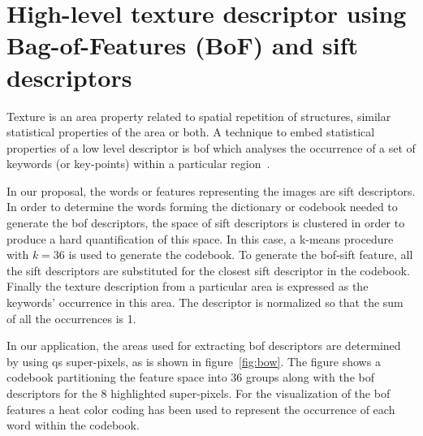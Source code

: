 \documentclass[a4paper, 10pt, conference]{llncs}      %
\begin{document}



\section{High-level texture descriptor using Bag-of-Features (BoF) and \ac{sift} descriptors}%
Texture is an area property related to spatial repetition of structures, similar statistical properties of the area or both. A technique to embed statistical properties of a low level descriptor is \ac{bof} which analyses the occurrence of a set of keywords (or key-points) within a particular region~\cite{csurka2004visual}. 

In our proposal, the words or features representing the images are \ac{sift} descriptors. In order to determine the words forming the dictionary or codebook needed to generate the \ac{bof} descriptors, the space of \ac{sift} descriptors is clustered in order to produce a hard quantification of this space. In this case, a k-means procedure with $k=36$ is used to generate the codebook. To generate the \ac{bof}-\ac{sift} feature, all the \ac{sift} descriptors are substituted for the closest \ac{sift} descriptor in the codebook. Finally the texture description from a particular area is expressed as the keywords' occurrence in this area. The descriptor is normalized so that the sum of all the occurrences is 1. 

In our application, the areas used for extracting \ac{bof} descriptors are determined by using \ac{qs} super-pixels, as is shown in figure~\ref{fig:bow}. The figure shows a codebook partitioning the feature space into 36 groups along with the \ac{bof} descriptors for the 8 highlighted super-pixels. For the visualization of the \ac{bof} features a heat color coding has been used to represent the occurrence of each word within the codebook.




\end{document}
